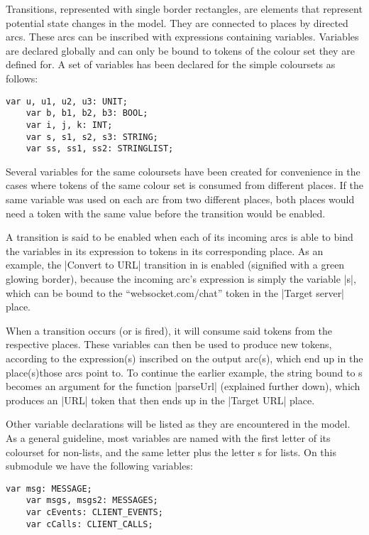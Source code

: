 	Transitions, represented with single border rectangles, are elements that
	represent potential state changes in the model. They are connected to places by
	directed arcs. These arcs can be inscribed with expressions containing
	variables. Variables are declared globally and can only be bound to tokens of
	the colour set they are defined for. A set of variables has been declared for
	the simple coloursets as follows:
	
	\begin{lstlisting}[label=lst:standard_vars,caption=Simple Colourset
	Variables,gobble=1] 
	var u, u1, u2, u3: UNIT;
	var b, b1, b2, b3: BOOL;
	var i, j, k: INT;
	var s, s1, s2, s3: STRING;
	var ss, ss1, ss2: STRINGLIST;
	\end{lstlisting}
	
	Several variables for the same coloursets have been created for convenience in
	the cases where tokens of the same colour set is consumed from different
	places.	If the same variable was used on each arc from two different places,
	both places would need a token with the same value before the transition
	would be enabled.
	
	A transition is said to be enabled when each of its incoming arcs is able to
	bind the variables in its expression to tokens in its corresponding place. As
	an example, the |Convert to URL| transition in  is enabled
	(signified with a green glowing border), because the incoming arc's expression
	is simply the variable |s|, which can be bound to the ``websocket.com/chat''
	token in the |Target server| place.
		
	When a transition occurs (or is fired), it will consume said tokens from the
	respective places. These variables can then be used to produce new tokens,
	according to the expression(s) inscribed on the output arc(s), which end up in
	the place(s)those arcs point to. To continue the earlier example, the string
	bound to s becomes an argument for the function |parseUrl| (explained further
	down), which produces an |URL| token that then ends up in the |Target URL|
	place.
	
	Other variable declarations will be listed as they are encountered in the
	model. As a general guideline, most variables are named with the first letter
	of its colourset for non-lists, and the same letter plus the letter s for
	lists. On this submodule we have the following variables:
	
	\begin{lstlisting}[label=lst:client_app_vars,caption=Client Application
	Variables,gobble=1]
	var msg: MESSAGE;
	var msgs, msgs2: MESSAGES;
	var cEvents: CLIENT_EVENTS;
	var cCalls: CLIENT_CALLS;
	\end{lstlisting}
	
